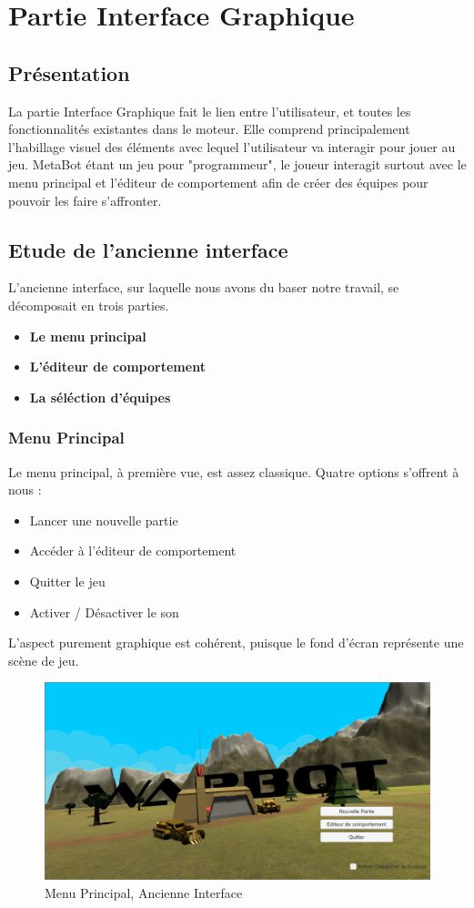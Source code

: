 \documentclass{report}
\begin{document}
\newpage
\chapter{Partie Interface Graphique}
\section{Présentation}
La partie Interface Graphique fait le lien entre l'utilisateur, et toutes les fonctionnalités existantes dans le moteur. Elle comprend principalement l'habillage visuel des éléments avec lequel l'utilisateur va interagir pour jouer au jeu. MetaBot étant un jeu pour "programmeur", le joueur interagit surtout avec le menu principal et l'éditeur de comportement afin de créer des équipes pour pouvoir les faire s'affronter. \newline


\section{Etude de l'ancienne interface}
L'ancienne interface, sur laquelle nous avons du baser notre travail, se décomposait en trois parties.
\begin{itemize}
\item\textbf{Le menu principal}
\item\textbf{L'éditeur de comportement}
\item\textbf{La séléction d'équipes}
\end{itemize}
\subsection{Menu Principal}
Le menu principal, à première vue, est assez classique. Quatre options s'offrent à nous :
\begin{itemize}
\item{Lancer une nouvelle partie}
\item{Accéder à l'éditeur de comportement}
\item{Quitter le jeu}
\item{Activer / Désactiver le son}
\end{itemize}
L'aspect purement graphique est cohérent, puisque le fond d'écran représente une scène de jeu.

\begin{figure}[!h]
	\centering
		\includegraphics[scale=0.50]{MainScreenOld}
	\caption{Menu Principal, Ancienne Interface}
\end{figure}
\end{document}
